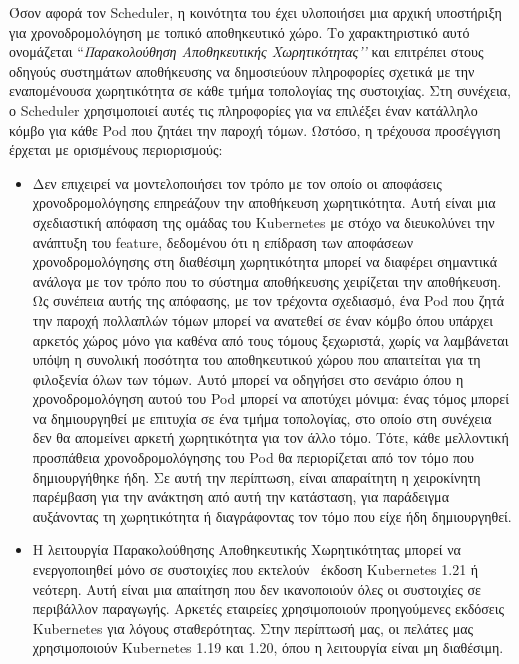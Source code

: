 Όσον αφορά τον Scheduler, η κοινότητα του  έχει υλοποιήσει μια
αρχική υποστήριξη για χρονοδρομολόγηση με τοπικό αποθηκευτικό χώρο. Το
χαρακτηριστικό αυτό ονομάζεται ``\textit{Παρακολούθηση Αποθηκευτικής Χωρητικότητας’’} και
επιτρέπει στους οδηγούς συστημάτων αποθήκευσης να δημοσιεύουν πληροφορίες
σχετικά με την εναπομένουσα χωρητικότητα σε κάθε τμήμα τοπολογίας της
συστοιχίας. Στη συνέχεια, ο Scheduler χρησιμοποιεί αυτές τις πληροφορίες για να
επιλέξει έναν κατάλληλο κόμβο για κάθε Pod που ζητάει την παροχή τόμων. Ωστόσο,
η τρέχουσα προσέγγιση έρχεται με ορισμένους περιορισμούς:

\begin{itemize}
      \item Δεν επιχειρεί να μοντελοποιήσει τον τρόπο με τον οποίο οι αποφάσεις
            χρονοδρομολόγησης επηρεάζουν την αποθήκευση χωρητικότητα. Αυτή είναι
            μια σχεδιαστική απόφαση της ομάδας του Kubernetes με στόχο να
            διευκολύνει την ανάπτυξη του feature, δεδομένου ότι η επίδραση των
            αποφάσεων χρονοδρομολόγησης  στη διαθέσιμη χωρητικότητα μπορεί να
            διαφέρει σημαντικά ανάλογα με τον τρόπο που το σύστημα αποθήκευσης
            χειρίζεται την αποθήκευση. Ως συνέπεια αυτής της απόφασης, με τον
            τρέχοντα σχεδιασμό, ένα Pod που ζητά την παροχή πολλαπλών τόμων
            μπορεί να ανατεθεί σε έναν κόμβο όπου υπάρχει αρκετός χώρος μόνο για
            καθένα από τους τόμους ξεχωριστά, χωρίς να λαμβάνεται υπόψη η
            συνολική ποσότητα του αποθηκευτικού χώρου που απαιτείται για τη
            φιλοξενία όλων των τόμων. Αυτό μπορεί να οδηγήσει στο σενάριο όπου η
            χρονοδρομολόγηση αυτού του Pod μπορεί να αποτύχει μόνιμα: ένας τόμος
            μπορεί να δημιουργηθεί με επιτυχία σε ένα τμήμα τοπολογίας, στο
            οποίο στη συνέχεια δεν θα απομείνει αρκετή χωρητικότητα για τον άλλο
            τόμο. Τότε, κάθε μελλοντική προσπάθεια χρονοδρομολόγησης του Pod θα
            περιορίζεται από τον τόμο που δημιουργήθηκε ήδη. Σε αυτή την
            περίπτωση, είναι απαραίτητη η χειροκίνητη παρέμβαση για την ανάκτηση
            από αυτή την κατάσταση, για παράδειγμα αυξάνοντας τη χωρητικότητα ή
            διαγράφοντας τον τόμο που είχε ήδη δημιουργηθεί.
      \item Η λειτουργία Παρακολούθησης Αποθηκευτικής Χωρητικότητας μπορεί να
            ενεργοποιηθεί μόνο σε συστοιχίες που εκτελούν \ έκδοση Kubernetes
            1.21 ή νεότερη. Αυτή είναι μια απαίτηση που δεν ικανοποιούν όλες οι
            συστοιχίες σε περιβάλλον παραγωγής. Αρκετές εταιρείες χρησιμοποιούν
            προηγούμενες εκδόσεις Kubernetes για λόγους σταθερότητας. Στην
            περίπτωσή μας, οι πελάτες μας χρησιμοποιούν Kubernetes 1.19 και
            1.20, όπου η λειτουργία είναι μη διαθέσιμη.
\end{itemize}

